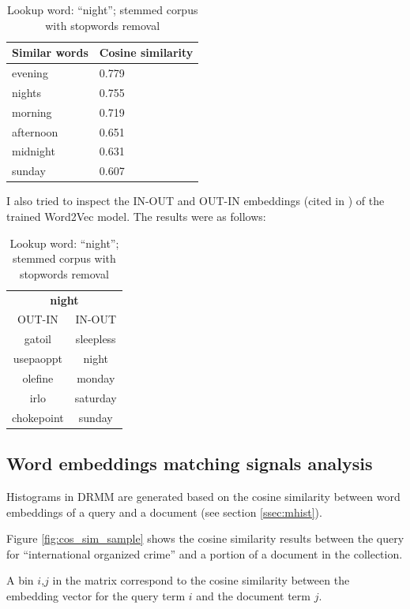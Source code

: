 \begin{table}[H]
\centering
\begin{tabular}{ll}
\textbf{Similar words} & \textbf{Cosine similarity} \\ \hline  
evening & 0.779 \\
nights & 0.755 \\
morning & 0.719 \\
afternoon & 0.651 \\
midnight & 0.631 \\
sunday & 0.607 \\
\end{tabular}
\caption{Lookup word: ``night''; stemmed corpus with stopwords removal}
\end{table}

I also tried to inspect the IN-OUT and OUT-IN embeddings (cited in \cite{Mitra2016ADE}) of the trained Word2Vec model. The results were as follows:

\begin{table}[H]
\centering
\begin{tabular}{cc}
\hline
\multicolumn{2}{c}{\textbf{night}} \\
OUT-IN & IN-OUT \\ \hline
gatoil & sleepless \\
usepaoppt & night \\
olefine & monday \\
irlo & saturday \\
chokepoint & sunday \\
\hline
\end{tabular}
\caption{Lookup word: ``night''; stemmed corpus with stopwords removal}
\label{tab:embsim2}
\end{table}

\subsection{Word embeddings matching signals analysis}

Histograms in DRMM are generated based on the cosine similarity between word embeddings of a query and a document (see section \ref{ssec:mhist}).

Figure \ref{fig:cos_sim_sample} shows the cosine similarity results between the query for ``international organized crime'' and a portion of a document in the collection.

A bin $i$,$j$ in the matrix correspond to the cosine similarity between the embedding vector for the query term $i$ and the document term $j$.

